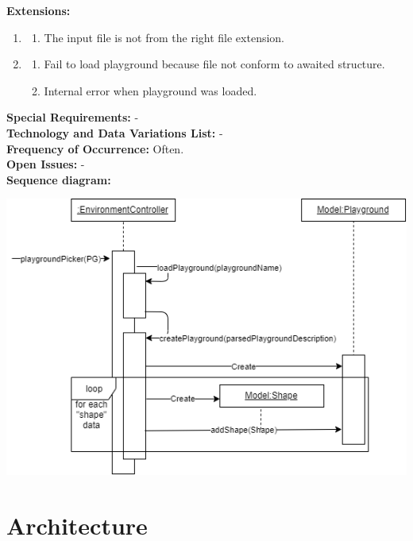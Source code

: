 \documentclass{scrbook}
\begin{document}
\textbf{Extensions: }
\begin{enumerate}\addtocounter{enumi}{1}
  \item 
  \begin{enumerate}
    \item The input file is not from the right file extension. 
  \end{enumerate}
  \item 
  \begin{enumerate}
    \item Fail to load playground because file not conform to awaited structure.
    \item Internal error when playground was loaded.
  \end{enumerate}
\end{enumerate}
\textbf{Special Requirements: }- \\
\textbf{Technology and Data Variations List: }- \\
\textbf{Frequency of Occurrence: }Often. \\
\textbf{Open Issues: }- \\
\textbf{Sequence diagram: } \\
\begin{center}
  \includegraphics[scale=0.7]{./loadPlayground_sd}
\end{center}



\chapter{Architecture \label{Architecture}}
\end{document}
